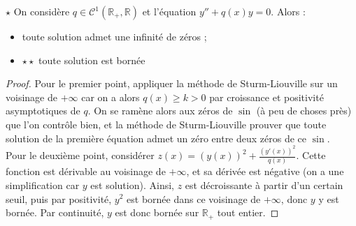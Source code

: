 \documentclass[french,a4paper]{article}
\newcommand{\R}{\mathbb{R}}
\theoremstyle{plain}
\theoremstyle{definition}
\theoremstyle{remark}
\begin{document}
\begin{ex}[Moulin.ED.49]{$\star$} On considère $q\in\mathcal{C}^1(\R_+,\R)$ et l'équation $y''+q(x)y=0$. Alors :
	\begin{itemize}
		\item toute solution admet une infinité de zéros ;
		\item $\star\star$ toute solution est bornée
	\end{itemize}
\end{ex}
\begin{proof}
	Pour le premier point, appliquer la méthode de Sturm-Liouville sur un voisinage de $+\infty$ car on a alors $q(x)\geqslant k>0$ par croissance et positivité asymptotiques de $q$. On se ramène alors aux zéros de $\sin$ (à peu de choses près) que l'on contrôle bien, et la méthode de Sturm-Liouville prouver que toute solution de la première équation admet un zéro entre deux zéros de ce $\sin$. \\ Pour le deuxième point, considérer $z(x)=\displaystyle (y(x))^2+\frac{(y'(x))^2}{q(x)}$. Cette fonction est dérivable au voisinage de $+\infty$, et sa dérivée est négative (on a une simplification car $y$ est solution). Ainsi, $z$ est décroissante à partir d'un certain seuil, puis par positivité, $y^2$ est bornée dans ce voisinage de $+\infty$, donc $y$ y est bornée. Par continuité, $y$ est donc bornée sur $\R_+$ tout entier.
\end{proof}
\end{document}
